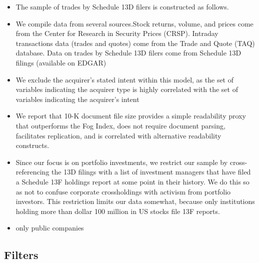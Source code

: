 \documentclass[12pt]{article}
\begin{document}
    \begin{itemize}
        
        \item The sample of trades by Schedule 13D filers is constructed as follows.\citep{Collin-Dufresne2015}

        \item We compile data from several sources.Stock returns, volume, and prices come from the Center for Research in Security Prices (CRSP). Intraday transactions data (trades and quotes) come from the Trade and Quote (TAQ) database. Data on trades by Schedule 13D filers come from Schedule 13D filings (available on EDGAR) \citep{Collin-Dufresne2015}

        \item We exclude the acquirer’s stated intent within this model, as the set of variables indicating the acquirer type is highly correlated with the set of variables indicating the acquirer’s intent \citep{Brigida2012}

        \item We report that 10-K document file size provides a simple readability proxy that outperforms the Fog Index, does not require document parsing, facilitates replication, and is correlated with alternative readability constructs.\citep{Loughran2014}

        \item Since our focus is on portfolio investments, we restrict our sample by cross-referencing the 13D filings with a list of investment managers that have filed a Schedule 13F holdings report at some point in their history. We do this so as not to confuse corporate crossholdings with activism from portfolio investors. This restriction limits our data somewhat, because only institutions holding more than dollar 100 million in US stocks file 13F reports. \citep{Greenwood2009}

        \item only public companies 
    \end{itemize}

\subsection{Filters}
\end{document}
